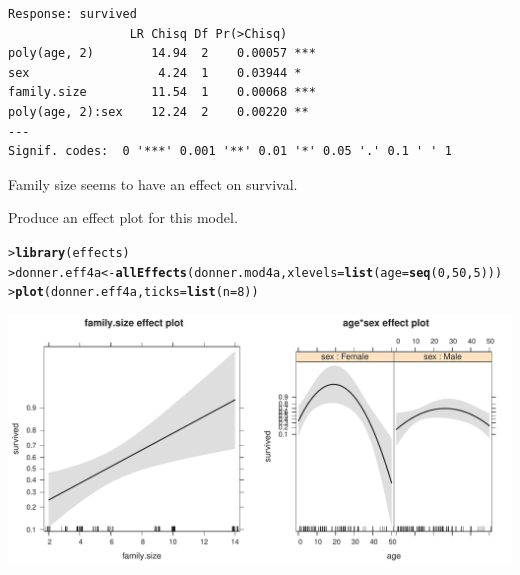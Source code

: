 \documentclass[10pt]{report}\usepackage[]{graphicx}\usepackage[]{color}
\makeatletter
\newcommand{\hlnum}[1]{\textcolor[rgb]{0.686,0.059,0.569}{#1}}%
\newcommand{\hlstd}[1]{\textcolor[rgb]{0.345,0.345,0.345}{#1}}%
\newcommand{\hlkwb}[1]{\textcolor[rgb]{0.69,0.353,0.396}{#1}}%
\newcommand{\hlkwc}[1]{\textcolor[rgb]{0.333,0.667,0.333}{#1}}%
\newcommand{\hlkwd}[1]{\textcolor[rgb]{0.737,0.353,0.396}{\textbf{#1}}}%
\newenvironment{kframe}{%
 \def\at@end@of@kframe{}%
 \ifinner\ifhmode%
  \def\at@end@of@kframe{\end{minipage}}%
  \begin{minipage}{\columnwidth}%
 \fi\fi%
 \def\FrameCommand##1{\hskip\@totalleftmargin \hskip-\fboxsep
 \colorbox{shadecolor}{##1}\hskip-\fboxsep
     \hskip-\linewidth \hskip-\@totalleftmargin \hskip\columnwidth}%
 \MakeFramed {\advance\hsize-\width
   \@totalleftmargin\z@ \linewidth\hsize
   \@setminipage}}%
 {\par\unskip\endMakeFramed%
 \at@end@of@kframe}
\newenvironment{knitrout}{}{} %
\renewenvironment{knitrout}{\small\renewcommand{\baselinestretch}{.85}}{} %
\makeatother
\begin{document}
\begin{Exercises}
\begin{enumerate*}
\begin{ans}
\begin{knitrout}
\begin{kframe}
\begin{verbatim}
Response: survived
                 LR Chisq Df Pr(>Chisq)    
poly(age, 2)        14.94  2    0.00057 ***
sex                  4.24  1    0.03944 *  
family.size         11.54  1    0.00068 ***
poly(age, 2):sex    12.24  2    0.00220 ** 
---
Signif. codes:  0 '***' 0.001 '**' 0.01 '*' 0.05 '.' 0.1 ' ' 1
\end{verbatim}
\end{kframe}
\end{knitrout}
    Family size seems to have an effect on survival.
    \end{ans}
    
    \item Produce an effect plot for this model.
    \begin{ans}
\begin{knitrout}\footnotesize
{}\color{fgcolor}\begin{kframe}
\begin{alltt}
\hlstd{> }\hlkwd{library}\hlstd{(effects)}
\hlstd{> }\hlstd{donner.eff4a} \hlkwb{<-} \hlkwd{allEffects}\hlstd{(donner.mod4a,} \hlkwc{xlevels}\hlstd{=}\hlkwd{list}\hlstd{(}\hlkwc{age}\hlstd{=}\hlkwd{seq}\hlstd{(}\hlnum{0}\hlstd{,}\hlnum{50}\hlstd{,}\hlnum{5}\hlstd{)))}
\hlstd{> }\hlkwd{plot}\hlstd{(donner.eff4a,} \hlkwc{ticks}\hlstd{=}\hlkwd{list}\hlstd{(}\hlkwc{n}\hlstd{=}\hlnum{8}\hlstd{))}
\end{alltt}
\end{kframe}

\centerline{\includegraphics[width=.5\textwidth]{soln/fig/ex7_4b-1} }



\end{knitrout}
    \end{ans}
    

\end{enumerate*}
\end{Exercises}
\end{document}
